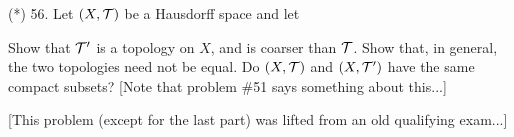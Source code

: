 \documentclass[12pt]{article}
\begin{document}
\begin{description}
\msk

\item{(*)} 56. Let $(X,{\mathcal T})$ be a Hausdorff space and let 

\ssk


\item{\spc} Show that
${\mathcal T}^\prime$ is a topology on $X$, and is coarser than ${\mathcal T}$. Show that, in general, 
the two topologies need not be equal. Do $(X,{\mathcal T})$ and $(X,{\mathcal T}^\prime)$ have the same compact
subsets? [Note that problem \#51 says something about this...]

\ssk

\item{\spc} [This problem (except for the last part) was lifted from an old qualifying exam...] 

\end{description}
\vfill
\end{document}
